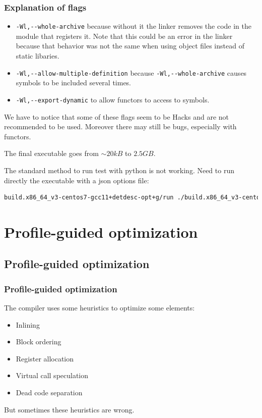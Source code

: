 \documentclass{beamer}
\begin{document}
    \begin{frame}[fragile]
        \frametitle{Explanation of flags}
        \begin{itemize}
            \item \verb'-Wl,--whole-archive' because without it the linker removes the code in the module that registers it.
            Note that this could be an error in the linker because that behavior was not the same when using object files instead of static libaries.
            \item \verb'-Wl,--allow-multiple-definition' because \verb'-Wl,--whole-archive' causes symbols to be included several times.
            \item \verb'-Wl,--export-dynamic' to allow functors to access to symbols.
        \end{itemize}

        We have to notice that some of these flags seem to be Hacks and are not recommended to be used.
        Moreover there may still be bugs, especially with functors.
    \end{frame}

    \begin{frame}[fragile]
        The final executable goes from $ \sim 20 kB $ to $ 2.5 GB $.

        The standard method to run test with python is not working. Need to run directly the executable with a json options file:
        \begin{lstlisting}[language=bash,basicstyle=\scriptsize,breaklines]
            build.x86_64_v3-centos7-gcc11+detdesc-opt+g/run ./build.x86_64_v3-centos7-gcc11+detdesc-opt+g/Gaudi/Gaudi/Gaudi_static options.json
        \end{lstlisting}
    \end{frame}

\section{Profile-guided optimization}

    \subsection{Profile-guided optimization}

    \begin{frame}
        \frametitle{Profile-guided optimization}

        The compiler uses some heuristics to optimize some elements:
        \begin{itemize}
            \item Inlining
            \item Block ordering
            \item Register allocation
            \item Virtual call speculation
            \item Dead code separation
        \end{itemize}
        But sometimes these heuristics are wrong.
    \end{frame}
\end{document}
